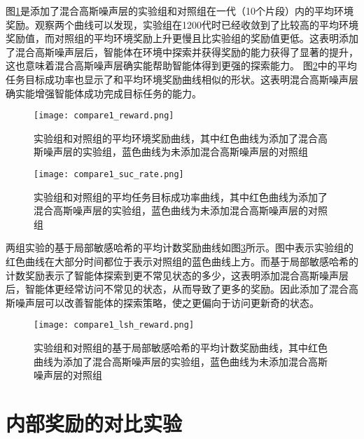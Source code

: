 图\ref{cmp1env_reward}是添加了混合高斯噪声层的实验组和对照组在一代（10个片段）内的平均环境奖励。观察两个曲线可以发现，实验组在1200代时已经收敛到了比较高的平均环境奖励值，而对照组的平均环境奖励上升更慢且比实验组的奖励值更低。这表明添加了混合高斯噪声层后，智能体在环境中探索并获得奖励的能力获得了显著的提升，这也意味着混合高斯噪声层确实能帮助智能体得到更强的探索能力。
图\ref{cmp1suc_rate}中的平均任务目标成功率也显示了和平均环境奖励曲线相似的形状。这表明混合高斯噪声层确实能增强智能体成功完成目标任务的能力。
        \begin{figure}[htpb]
        \centering
        \texttt{[image: compare1\_reward.png]}
        \caption{实验组和对照组的平均环境奖励曲线，其中红色曲线为添加了混合高斯噪声层的实验组，蓝色曲线为未添加混合高斯噪声层的对照组}
            \label{cmp1env_reward}
        \end{figure}

        \begin{figure}[htpb]
        \centering
        \texttt{[image: compare1\_suc\_rate.png]}
        \caption{实验组和对照组的平均任务目标成功率曲线，其中红色曲线为添加了混合高斯噪声层的实验组，蓝色曲线为未添加混合高斯噪声层的对照组}
            \label{cmp1suc_rate}
        \end{figure}

两组实验的基于局部敏感哈希的平均计数奖励曲线如图\ref{cmp1lsh_reward}所示。图中表示实验组的红色曲线在大部分时间都位于表示对照组的蓝色曲线上方。而基于局部敏感哈希的计数奖励表示了智能体探索到更不常见状态的多少，这表明添加混合高斯噪声层后，智能体更经常访问不常见的状态，从而导致了更多的奖励。因此添加了混合高斯噪声层可以改善智能体的探索策略，使之更偏向于访问更新奇的状态。
        \begin{figure}[htpb]
        \centering
        \texttt{[image: compare1\_lsh\_reward.png]}
        \caption{实验组和对照组的基于局部敏感哈希的平均计数奖励曲线，其中红色曲线为添加了混合高斯噪声层的实验组，蓝色曲线为未添加混合高斯噪声层的对照组}
            \label{cmp1lsh_reward}
        \end{figure}

\section{内部奖励的对比实验}


